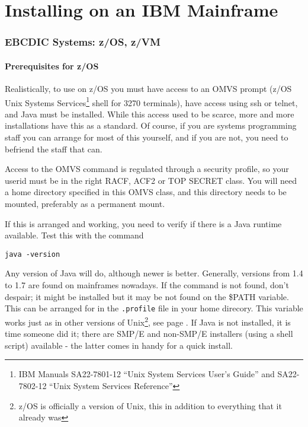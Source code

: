 \chapter{Installing on an IBM Mainframe}
\subsection{EBCDIC Systems: z/OS, z/VM}

\subsubsection{Prerequisites for z/OS}
Realistically, to use \nr{} on z/OS you must have access to an OMVS
prompt (z/OS Unix Systems Services\footnote{IBM Manuals SA22-7801-12 ``Unix System
  Services User's Guide''
  and  SA22-7802-12 ``Unix System Services Reference''}  shell for 3270 terminals), have
access using ssh or telnet, and Java must be installed. While this
access used to be scarce, more and more installations have this as a
standard. Of course, if you are systems programming staff you can
arrange for most of this yourself, and if you are not, you need to
befriend the staff that can.

Access to the OMVS command is regulated through a security profile, so your userid
must be in the right RACF, ACF2 or TOP SECRET class. You will need a home
directory specified in this OMVS class, and this directory needs to be
mounted, preferably as a permanent mount.

If this is arranged and working, you need to verify if there is a Java
runtime available. Test this with the command 
\begin{verbatim}
java -version
\end{verbatim}
Any version of Java will do, although newer is better. Generally,
versions from 1.4 to 1.7 are found on mainframes nowadays. If the
command is not found, don't despair; it might be installed but it may
be not found on the \$PATH variable. This can be arranged for in the
\texttt{.profile} file in your home direcory. This variable works
just as in other versions of Unix\footnote{z/OS is officially a
  version of Unix, this in addition to everything that it already was}, see
page \pageref{install_classpath}. If Java is not installed, it is time
someone did it; there are SMP/E and non-SMP/E installers (using a
shell script) available -
the latter comes in handy for a quick install.

